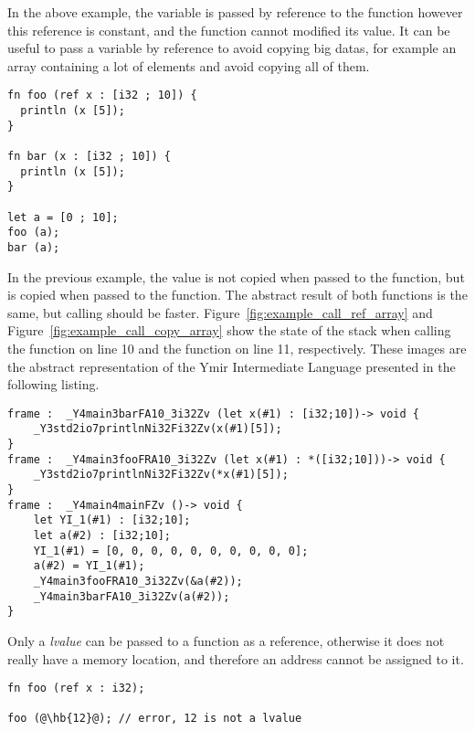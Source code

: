 In the above example, the variable  is passed by reference to the
function  however this reference is constant, and the function
 cannot modified its value. It can be useful to pass a variable by
reference to avoid copying big datas, for example an array containing a lot of
elements and avoid copying all of them.

\begin{lstlisting}[style=coloredverbatim, label=lst:result_copy_v_ref_array, caption=Example of passing an array by reference vs. by value]
fn foo (ref x : [i32 ; 10]) {
  println (x [5]);
}

fn bar (x : [i32 ; 10]) {
  println (x [5]);
}

let a = [0 ; 10];
foo (a);
bar (a);
\end{lstlisting}

In the previous example, the value is not copied when passed to the 
function, but is copied when passed to the  function. The abstract
result of both functions is the same, but calling  should be faster.
Figure~\ref{fig:example_call_ref_array} and
Figure~\ref{fig:example_call_copy_array} show the state of the stack when
calling the  function on line 10 and the  function on
line 11, respectively. These images are the abstract representation of the Ymir
Intermediate Language presented in the following listing.

\begin{lstlisting}[style=intermediateVerb, caption=YIL result of Listing~\ref{lst:result_copy_v_ref_array}]
frame :  _Y4main3barFA10_3i32Zv (let x(#1) : [i32;10])-> void {
    _Y3std2io7printlnNi32Fi32Zv(x(#1)[5]);
}
frame :  _Y4main3fooFRA10_3i32Zv (let x(#1) : *([i32;10]))-> void {
    _Y3std2io7printlnNi32Fi32Zv(*x(#1)[5]);
}
frame :  _Y4main4mainFZv ()-> void {
    let YI_1(#1) : [i32;10];
    let a(#2) : [i32;10];
    YI_1(#1) = [0, 0, 0, 0, 0, 0, 0, 0, 0, 0];
    a(#2) = YI_1(#1);
    _Y4main3fooFRA10_3i32Zv(&a(#2));
    _Y4main3barFA10_3i32Zv(a(#2));
}
\end{lstlisting}



Only a \textit{lvalue} can be passed to a function as a reference, otherwise it
does not really have a memory location, and therefore an address cannot be
assigned to it.

\begin{lstlisting}[style=coloredverbatim, escapechar=@]
fn foo (ref x : i32);

foo (@\hb{12}@); // error, 12 is not a lvalue
\end{lstlisting}

